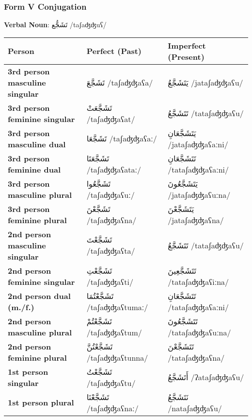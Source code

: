 \documentclass[letterpaper,12pt]{article}
\begin{document}
\subsubsection*{Form V Conjugation}
\par{\large \textbf{Verbal Noun}: \textarabic{تَشَجُّع} /taʃaʤʤuʕ/}

\begin{longtable}{|>{\raggedright}p{3.5cm}|p{5cm}|p{5cm}|}
\hline
\textbf{Person} & \textbf{Perfect (Past)} & \textbf{Imperfect (Present)} \\
\hline
\textbf{3rd person masculine singular} & \textarabic{تَشَجَّعَ} /taʃaʤʤaʕa/ & \textarabic{يَتَشَجَّعُ} /jataʃaʤʤaʕu/ \\
\hline
\textbf{3rd person feminine singular} & \textarabic{تَشَجَّعَتْ} /taʃaʤʤaʕat/ & \textarabic{تَتَشَجَّعُ} /tataʃaʤʤaʕu/ \\
\hline
\textbf{3rd person masculine dual} & \textarabic{تَشَجَّعَا} /taʃaʤʤaʕaː/ & \textarabic{يَتَشَجَّعَانِ} /jataʃaʤʤaʕaːni/ \\
\hline
\textbf{3rd person feminine dual} & \textarabic{تَشَجَّعَتَا} /taʃaʤʤaʕataː/ & \textarabic{تَتَشَجَّعَانِ} /tataʃaʤʤaʕaːni/ \\
\hline
\textbf{3rd person masculine plural} & \textarabic{تَشَجَّعُوا} /taʃaʤʤaʕuː/ & \textarabic{يَتَشَجَّعُونَ} /jataʃaʤʤaʕuːna/ \\
\hline
\textbf{3rd person feminine plural} & \textarabic{تَشَجَّعْنَ} /taʃaʤʤaʕna/ & \textarabic{يَتَشَجَّعْنَ} /jataʃaʤʤaʕna/ \\
\hline
\textbf{2nd person masculine singular} & \textarabic{تَشَجَّعْتَ} /taʃaʤʤaʕta/ & \textarabic{تَتَشَجَّعُ} /tataʃaʤʤaʕu/ \\
\hline
\textbf{2nd person feminine singular} & \textarabic{تَشَجَّعْتِ} /taʃaʤʤaʕti/ & \textarabic{تَتَشَجَّعِينَ} /tataʃaʤʤaʕiːna/ \\
\hline
\textbf{2nd person dual (m./f.)} & \textarabic{تَشَجَّعْتُمَا} /taʃaʤʤaʕtumaː/ & \textarabic{تَتَشَجَّعَانِ} /tataʃaʤʤaʕaːni/ \\
\hline
\textbf{2nd person masculine plural} & \textarabic{تَشَجَّعْتُمْ} /taʃaʤʤaʕtum/ & \textarabic{تَتَشَجَّعُونَ} /tataʃaʤʤaʕuːna/ \\
\hline
\textbf{2nd person feminine plural} & \textarabic{تَشَجَّعْتُنَّ} /taʃaʤʤaʕtunna/ & \textarabic{تَتَشَجَّعْنَ} /tataʃaʤʤaʕna/ \\
\hline
\textbf{1st person singular} & \textarabic{تَشَجَّعْتُ} /taʃaʤʤaʕtu/ & \textarabic{أَتَشَجَّعُ} /ʔataʃaʤʤaʕu/ \\
\hline
\textbf{1st person plural} & \textarabic{تَشَجَّعْنَا} /taʃaʤʤaʕnaː/ & \textarabic{نَتَشَجَّعُ} /nataʃaʤʤaʕu/ \\
\hline
\end{longtable}
\end{document}
